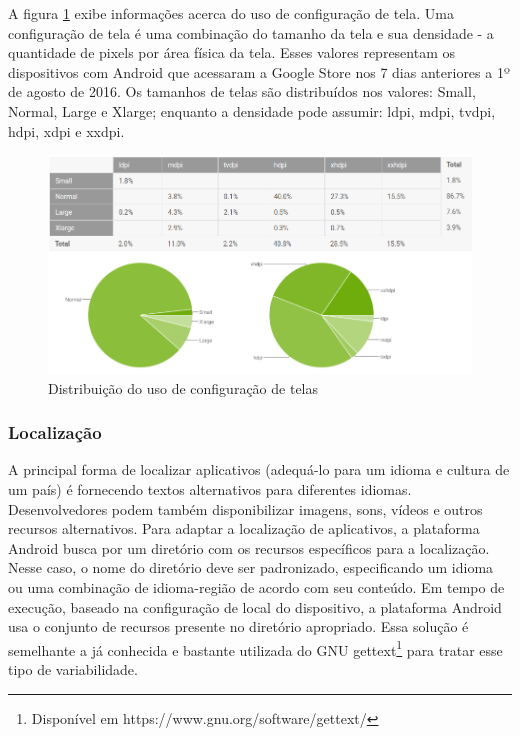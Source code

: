 A figura \ref{fig:screen_configuration} exibe informações acerca do uso de configuração de tela.
Uma configuração de tela é uma combinação do tamanho da tela e sua densidade -
a quantidade de pixels por área física da tela. Esses valores representam os
dispositivos com Android que acessaram a Google Store nos 7 dias anteriores
a 1º de agosto de 2016. Os tamanhos de telas são distribuídos nos valores:
Small, Normal, Large e Xlarge; enquanto a densidade pode assumir: ldpi, mdpi,
tvdpi, hdpi, xdpi e xxdpi.

\begin{figure}[ht]
\centering
\includegraphics[width=1\textwidth]{imagens/screen_configuration.png}
\caption{Distribuição do uso de configuração de telas \cite{Dashboard}}
\label{fig:screen_configuration}
\end{figure}

\subsubsection{Localização}

A principal forma de localizar aplicativos (adequá-lo para um idioma e cultura de um país)
é fornecendo textos alternativos para diferentes idiomas. Desenvolvedores podem
também disponibilizar imagens, sons, vídeos e outros recursos alternativos.
Para adaptar a localização de aplicativos, a plataforma Android busca por um
diretório com os recursos específicos para a localização. Nesse caso, o nome do
diretório deve ser padronizado, especificando um idioma ou uma combinação de
idioma-região de acordo com seu conteúdo. Em tempo de execução, baseado na
configuração de local do dispositivo, a plataforma Android usa o conjunto de
recursos presente no diretório apropriado. Essa solução é semelhante a já conhecida
e bastante utilizada do GNU gettext\footnote{Disponível em https://www.gnu.org/software/gettext/}
para tratar esse tipo de variabilidade.

